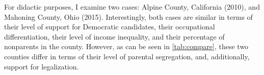 For didactic purposes, I examine two cases: Alpine County, California (2010), and Mahoning County, Ohio (2015). Interestingly, both cases are similar in terms of their level of support for Democratic candidates, their occupational differentiation, their level of income inequality, and their percentage of nonparents in the county. However, as can be seen in \ref{tab:compare}, these two counties differ in terms of their level of parental segregation, and, additionally, support for legalization.










